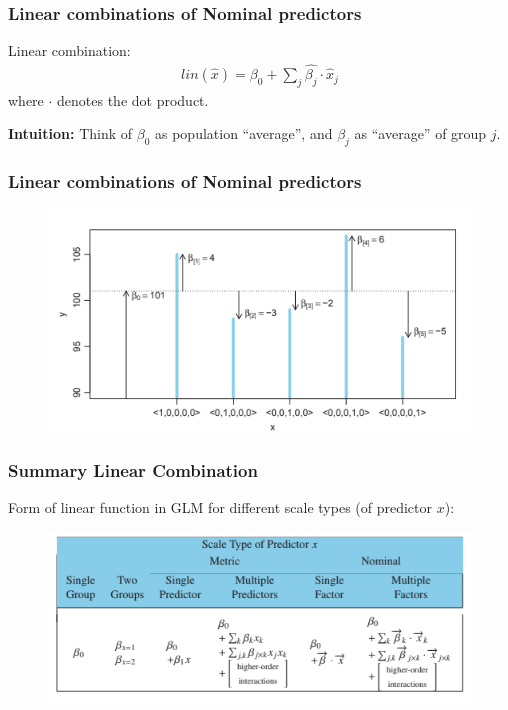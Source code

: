 \documentclass[usenames,dvipsnames,table]{beamer}
\begin{document}
\begin{frame}
\frametitle{Linear combinations of Nominal predictors}

Linear combination:
\begin{align*}
    lin(\widehat{x}) = \beta_0 + \sum_j \widehat{\beta_j} \cdot \widehat{x}_j
\end{align*}
where $\cdot$ denotes the dot product.

\vspace{1em}
\textbf{Intuition:} Think of $\beta_0$ as population ``average'', and $\beta_j$ as ``average'' of group $j$.

\end{frame}

\begin{frame}
\frametitle{Linear combinations of Nominal predictors}
\begin{figure}
\centering
\includegraphics[width=\textwidth]{img/fig15_4}
\end{figure}
\end{frame}

\begin{frame}
\frametitle{Summary Linear Combination}
Form of linear function in GLM for different scale types (of predictor $x$):
\begin{figure}
\centering
\includegraphics[width=\textwidth]{img/fig15_11}
\end{figure}
\end{frame}
\end{document}

